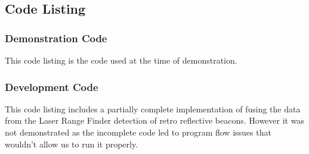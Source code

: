 	\pagebreak
	\subsection{Code Listing}
		\subsubsection{Demonstration Code}
		This code listing is the code used at the time of demonstration.
			
			\pagebreak
		\subsubsection{Development Code}
			This code listing includes a partially complete implementation of fusing the data from the Laser Range Finder detection of retro reflective beacons. However it was not demonstrated as the incomplete code led to program flow issues that wouldn't allow us to run it properly.
			
			\pagebreak